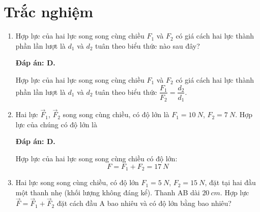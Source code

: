 \whiteBGstarBegin
\setcounter{section}{0}
\section{Trắc nghiệm}
\begin{enumerate}[label=\bfseries Câu \arabic*:]
	
	\item {}
	
	\cauhoi
	{Hợp lực của hai lực song song cùng chiều $F_1$ và $F_2$ có giá cách hai lực thành phần lần lượt là $d_1$ và $d_2$ tuân theo biểu thức nào sau đây?
	}
	
	\loigiai
	{	\textbf{Đáp án: D.}
		
Hợp lực của hai lực song song cùng chiều $F_1$ và $F_2$ có giá cách hai lực thành phần lần lượt là $d_1$ và $d_2$ tuân theo biểu thức $\dfrac{F_1}{F_2} = \dfrac{d_2}{d_1}$.
	}
	\item {}
	
	\cauhoi
	{Hai lực $\vec F_1$, $\vec F_2$ song song cùng chiều, có độ lớn là $F_1 =\SI{10}{N}$, $F_2=\SI{7}{N}$. Hợp lực của chúng có độ lớn là
	}
	
	\loigiai
	{	\textbf{Đáp án: D.}
		
	Hợp lực của hai lực song song cùng chiều có độ lớn:
	$$F=F_1 + F_2 = \SI{17}{N}$$
	}
	
	\item {}
	
	\cauhoi
	{Hai lực song song cùng chiều, có độ lớn $F_1=\SI{5}{N}$, $F_2=\SI{15}{N}$, đặt tại hai đầu một thanh nhẹ (khối lượng không đáng kể). Thanh AB dài $\SI{20}{cm}$. Hợp lực $\vec F = \vec F_1 + \vec F_2$ đặt cách đầu A bao nhiêu và có độ lớn bằng bao nhiêu?
	}
	

\end{enumerate}
